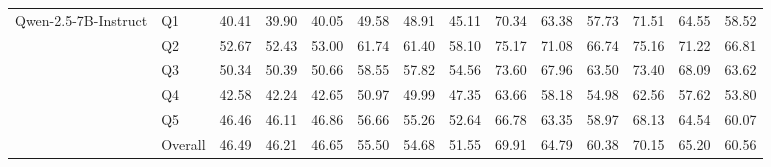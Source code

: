 \begin{table*}[htbp]
\begin{tabular}{llcccccccccccc}
\midrule
\multirow{6}{*}{Qwen-2.5-7B-Instruct}
& Q1      & 40.41 & 39.90 & 40.05 & 49.58 & 48.91 & 45.11 & 70.34 & 63.38 & 57.73 & 71.51 & 64.55 & 58.52 \\
& Q2      & 52.67 & 52.43 & 53.00 & 61.74 & 61.40 & 58.10 & 75.17 & 71.08 & 66.74 & 75.16 & 71.22 & 66.81 \\
& Q3      & 50.34 & 50.39 & 50.66 & 58.55 & 57.82 & 54.56 & 73.60 & 67.96 & 63.50 & 73.40 & 68.09 & 63.62 \\
& Q4      & 42.58 & 42.24 & 42.65 & 50.97 & 49.99 & 47.35 & 63.66 & 58.18 & 54.98 & 62.56 & 57.62 & 53.80 \\
& Q5      & 46.46 & 46.11 & 46.86 & 56.66 & 55.26 & 52.64 & 66.78 & 63.35 & 58.97 & 68.13 & 64.54 & 60.07 \\
& Overall & 46.49 & 46.21 & 46.65 & 55.50 & 54.68 & 51.55 & 69.91 & 64.79 & 60.38 & 70.15 & 65.20 & 60.56 \\
\bottomrule
\end{tabular}
\label{tab:paperbench-all-in-one}
\end{table*}




